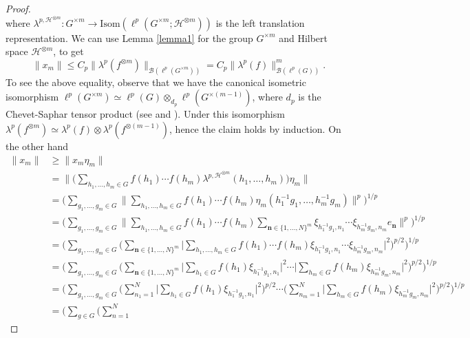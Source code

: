 \documentclass[12pt]{amsart}
\theoremstyle{definition}
\theoremstyle{remark}
\numberwithin{equation}{section}
\newcommand{\mc}{\mathcal}
\begin{document}
\begin{proof}
\[\]
where $\lambda^{p,\mc{H}^{\otimes m}}\colon G^{\times m}\rightarrow \mbox{Isom}(\ell^p(G^{\times m};\mc{H}^{\otimes m}))$ is the left translation representation.
We can use Lemma \ref{lemma1} for the group $G^{\times m}$ and Hilbert space $\mathcal{H}^{\otimes m}$, to get
\begin{equation}\label{eq2}
\|x_m\|\le C_p
 \bigl\|\lambda^p(f^{\otimes m})\bigr\|_{\mc{B} (\ell^p(G^{\times m}))}
=
C_p \|\lambda^p(f)\|_{\mc{B}(\ell^p(G))}^m.
\end{equation}
To see the above equality, observe that we have the canonical isometric isomorphism $\ell^p(G^{\times m})\simeq \ell^p(G)\otimes_{d_p}\ell^{p}(G^{\times (m-1)})$, where $d_p$ is the Chevet-Saphar tensor product (see \cite[Section 4]{Chevet} and \cite[Section 6.2]{Ryan}). Under this isomorphism $\lambda^p(f^{\otimes m})\simeq \lambda^p(f) \otimes \lambda^p(f^{\otimes (m-1)})$, hence the claim holds by induction. On the other hand
\begin{align*}
\|x_m\|&\geq \|x_m \eta_m\|\\
&=
\bigl\|
\bigl(
\sum_{h_1,\dotsc,h_m\in G}
f(h_1)\cdots f(h_m) \lambda^{p,\mathcal{H}^{\otimes m}} (h_1,\dotsc,h_m)
\bigr)
\eta_m\bigr\|\\
&=
\bigl(\sum_{g_1,\dotsc,g_m\in G}\bigl\|
\sum_{h_1,\dotsc,h_m\in G}
f(h_1)\cdots f(h_m)
\eta_m(h_1^{-1} g_1,\dotsc, h_m^{-1} g_m)
\bigr\|^p\bigr)^{1/p}\\
&=
\bigl(\sum_{g_1,\dotsc,g_m\in G}\bigl\|
\sum_{h_1,\dotsc,h_m\in G}
f(h_1)\cdots f(h_m)
\sum_{\mathbf{n}\in \{1,\dotsc,N\}^m}
\xi_{h_1^{-1} g_1, n_1}\cdots
\xi_{h_m^{-1} g_m, n_m} e_{\mathbf{n}}
\bigr\|^p\bigr)^{1/p}\\
&=
\bigl(\sum_{g_1,\dotsc,g_m\in G}
\bigl(
\sum_{\mathbf{n}\in \{1,\dotsc,N\}^m}
\bigl|
\sum_{h_1,\dotsc,h_m\in G}
f(h_1)\cdots f(h_m)
\xi_{h_1^{-1} g_1, n_1}\cdots
\xi_{h_m^{-1} g_m, n_m}
\bigr|^2\bigr)^{p/2}\bigr)^{1/p}\\
&=
\bigl(\sum_{g_1,\dotsc,g_m\in G}
\bigl(
\sum_{\mathbf{n}\in \{1,\dotsc,N\}^m}
\bigl|
\sum_{h_1\in G}
f(h_1)
\xi_{h_1^{-1} g_1, n_1}
\bigr|^2\cdots
\bigl|
\sum_{h_m\in G}
f(h_m)
\xi_{h_m^{-1} g_m, n_m}
\bigr|^2  \bigr)^{p/2}\bigr)^{1/p}\\
&=
\bigl(\sum_{g_1,\dotsc,g_m\in G}
\bigl(
\sum_{n_1=1}^N
\bigl|
\sum_{h_1\in G}
f(h_1)
\xi_{h_1^{-1} g_1, n_1}
\bigr|^2\bigr)^{p/2} \cdots
\bigl(
\sum_{n_m=1}^N
\bigl|
\sum_{h_m\in G}
f(h_m)
\xi_{h_m^{-1} g_m, n_m}
\bigr|^2\bigr)^{p/2}
\bigr)^{1/p}\\
&=
\bigl(
\sum_{g\in G}\bigl(
\sum_{n=1}^{N}

\end{align*}
\end{proof}
\end{document}
